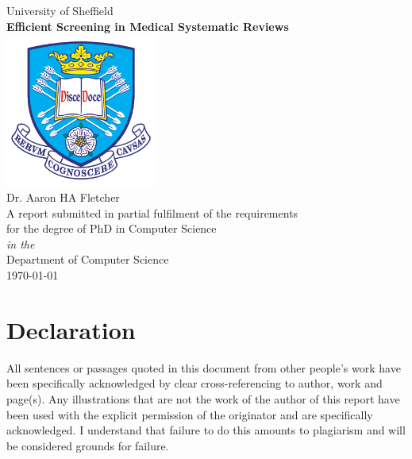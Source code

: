 \documentclass[10pt,oneside]{book}
\begin{document}

\begin{titlepage}



\begin{center}
{\LARGE University of Sheffield}\\[1.5cm]
\linespread{1.2}\huge {\bfseries Efficient Screening in Medical Systematic Reviews}\\[1.5cm]
\linespread{1}
\includegraphics[width=5cm]{Confirmation Review/images/tuoslogo.png}\\[1cm]
{\Large Dr. Aaron HA Fletcher}\\[1cm]
\large A report submitted in partial fulfilment of the requirements\\ for the degree of PhD in Computer Science\\[0.3cm] 
\textit{in the}\\[0.3cm]
Department of Computer Science\\[2cm]
\today
\end{center}

\end{titlepage}


\newpage
\section*{\Large Declaration}

All sentences or passages quoted in this document from other people's work have been specifically acknowledged by clear cross-referencing to author, work and page(s).  Any illustrations that are not the work of the author of this report have been used with the explicit permission of the originator and are specifically acknowledged.  I understand that failure to do this amounts to plagiarism and will be considered grounds for failure.
\end{document}
